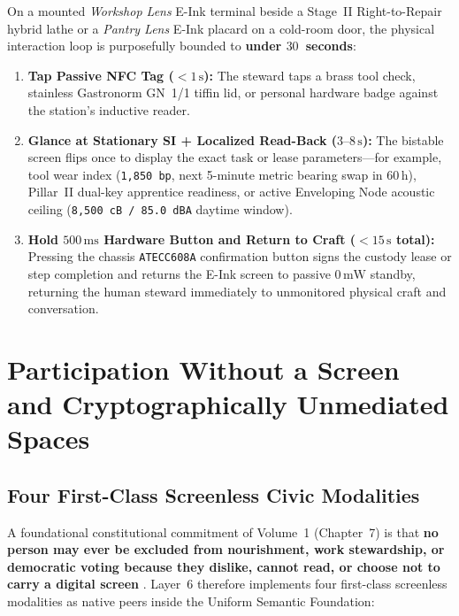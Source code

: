 On a mounted \textit{Workshop Lens} E-Ink terminal beside a Stage~II Right-to-Repair hybrid lathe or a \textit{Pantry Lens} E-Ink placard on a cold-room door, the physical interaction loop is purposefully bounded to \textbf{under $30$~seconds}:
\begin{enumerate}
    \item \textbf{Tap Passive NFC Tag ($< 1\,\mathrm{s}$):} The steward taps a brass tool check, stainless Gastronorm GN~1/1 tiffin lid, or personal hardware badge against the station's inductive reader.
    \item \textbf{Glance at Stationary SI + Localized Read-Back ($3\text{--}8\,\mathrm{s}$):} The bistable screen flips once to display the exact task or lease parameters---for example, tool wear index (\texttt{1,850 bp}, next 5-minute metric bearing swap in $60\,\mathrm{h}$), Pillar~II dual-key apprentice readiness, or active Enveloping Node acoustic ceiling (\texttt{8,500 cB / 85.0 dBA} daytime window).
    \item \textbf{Hold $500\,\mathrm{ms}$ Hardware Button and Return to Craft ($< 15\,\mathrm{s}$ total):} Pressing the chassis \texttt{ATECC608A} confirmation button signs the custody lease or step completion and returns the E-Ink screen to passive $0\,\mathrm{mW}$ standby, returning the human steward immediately to unmonitored physical craft and conversation.
\end{enumerate}

\section{Participation Without a Screen and Cryptographically Unmediated Spaces}
\label{sec:screenless-unmediated}

\subsection{Four First-Class Screenless Civic Modalities}

A foundational constitutional commitment of Volume~1 (Chapter~7) is that \textbf{no person may ever be excluded from nourishment, work stewardship, or democratic voting because they dislike, cannot read, or choose not to carry a digital screen} \parencite{illich1973,costanzachock2020design}. Layer~6 therefore implements four first-class screenless modalities as native peers inside the Uniform Semantic Foundation:

